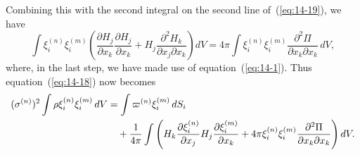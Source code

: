 Combining this with the second integral on the second line of~(\ref{eq:14-19}), we have
\begin{equation}
\label{eq:14-21}
\int \xi_i^{(n)} \xi_i^{(m)} \left( \frac{\partial H_j}{\partial x_k} \frac{\partial H_j}{\partial x_k} + H_j \frac{\partial^2 H_k}{\partial x_j \partial x_k} \right) dV = 4\pi \int \xi_i^{(n)} \xi_i^{(m)} \frac{\partial^2 \Pi}{\partial x_k \partial x_k} \, dV,
\end{equation}
where, in the last step, we have made use of equation~(\ref{eq:14-1}). Thus equation~(\ref{eq:14-18}) now becomes
\begin{align}
\label{eq:14-22}
(\sigma^{(n)})^2 \int \rho \xi_i^{(n)} \xi_i^{(m)} \, dV &= \int \varpi^{(n)} \xi_i^{(m)} \, dS_i \notag \\
&\quad + \frac{1}{4\pi} \int \left( H_k \frac{\partial \xi_i^{(n)}}{\partial x_j} H_j \frac{\partial \xi_i^{(m)}}{\partial x_k} + 4\pi \xi_i^{(n)} \xi_i^{(m)} \frac{\partial^2 \Pi}{\partial x_k \partial x_k} \right) dV.
\end{align}

